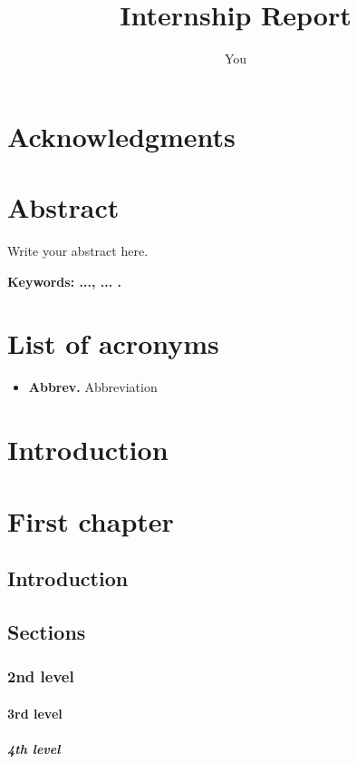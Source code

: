 \documentclass[12pt,a4paper,oneside,english]{book}
\author{You}
\title{Internship Report}
\begin{document}

\chapter*{Acknowledgments}

\frontmatter
\chapter*{Abstract}
\normalsize{Write your abstract here.

\medskip
{\noindent \textbf{Keywords: ..., ... .} }

\tableofcontents{}
\newpage 
\listoffigures
\newpage 
\listoftables
\newpage
{}
\chapter*{List of acronyms}
\begin{itemize}
\item \textbf{Abbrev.} Abbreviation
\end{itemize}

\mainmatter
\chapter*{Introduction}


\chapter{First chapter}
\label{ch:1er}
\section*{Introduction}

\section{Sections}
\subsection{2nd level}
\subsubsection{3rd level}
\paragraph{4th level}

}
\end{document}
